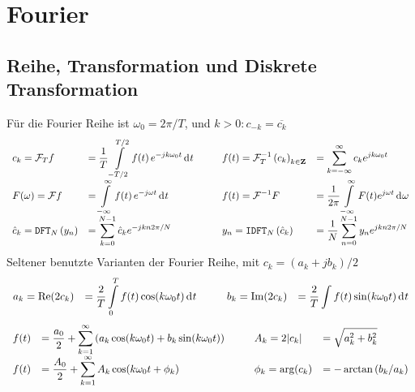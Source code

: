 \section{Fourier}
\subsection{Reihe, Transformation und Diskrete Transformation}
F\"ur die Fourier Reihe ist \(\omega_0 = 2\pi / T\), und \(k > 0 : c_{-k} = \overline{c_k}\)
\[
  \everymath={\displaystyle}
  \begin{array}{l l @{\hspace{1cm}} l l}
    c_k = \fourier_T f &=
    \frac{1}{T} \int\limits_{-T/2}^{T/2} f(t) \, e^{-jk\omega_0 t} \di{t}
      &
      f(t) = \ifourier_T \left( c_k \right)_{k\in\mathbf{Z}} &=
      \sum_{k=-\infty}^{\infty} c_k e^{jk\omega_0 t}
      \\

    F(\omega) = \fourier f &=
    \int\limits_{-\infty}^{\infty} f(t) \, e^{-j\omega t} \di{t}
      &
      f(t) = \ifourier F &=
      \frac{1}{2\pi} \int\limits_{-\infty}^\infty F(t) e^{j\omega t} \di{\omega}
      \\

    \hat{c}_k = \mathtt{DFT}_N \left( y_n \right) &=
    \sum_{k=0}^{N-1} \hat{c}_k e^{-jkn2\pi /N}
      &
      y_n = \mathtt{IDFT}_N \left( \hat{c}_k \right) &=
      \frac{1}{N}\sum_{n=0}^{N-1} y_n e^{jkn2\pi /N}
  \end{array}
\]
Seltener benutzte Varianten der Fourier Reihe, mit \(c_k = (a_k + jb_k) / 2\)
\[
  \everymath={\displaystyle}
  \begin{array}{l l @{\hspace{1cm}} l l}
    a_k = \real(2 c_k) &= \frac{2}{T} \int\limits_0^T f(t) \cos(k\omega_0 t) \di{t}
    &
    b_k = \imag(2 c_k) &= \frac{2}{T} \int f(t) \sin(k\omega_0 t) \di{t}
  \end{array}
\]
\[
  \everymath={\displaystyle}
  \begin{array}{l l @{\hspace{1cm}} l l}
    f(t) &= \frac{a_0}{2} + \sum_{k=1}^\infty \left(
        a_k \cos(k\omega_0 t) + b_k \sin(k\omega_0 t)
      \right)
      & A_k = 2|c_k| &= \sqrt{a_k^2 + b_k^2}
      \\
    f(t) &= \frac{A_0}{2} + \sum_{k=1}^\infty A_k \cos(k\omega_0 t + \phi_k)
      & \phi_k = \arg(c_k) &= -\arctan{(b_k / a_k)}
  \end{array}
\]

